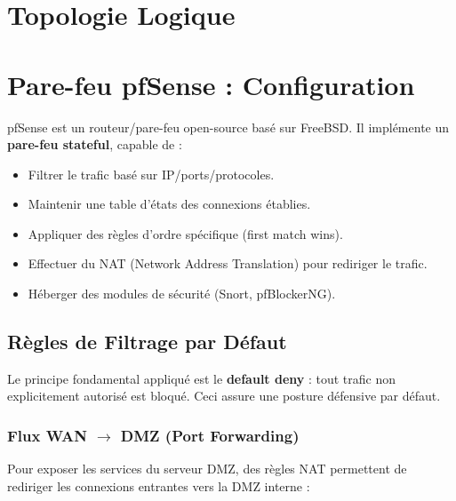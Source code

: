 \documentclass[12pt,a4paper,openany]{report}
\begin{document}
\section{Topologie Logique}


\section{Pare-feu pfSense : Configuration}

pfSense est un routeur/pare-feu open-source basé sur FreeBSD. Il implémente un \textbf{pare-feu stateful}, capable de :
\begin{itemize}
	\item Filtrer le trafic basé sur IP/ports/protocoles.
	\item Maintenir une table d'états des connexions établies.
	\item Appliquer des règles d'ordre spécifique (first match wins).
	\item Effectuer du NAT (Network Address Translation) pour rediriger le trafic.
	\item Héberger des modules de sécurité (Snort, pfBlockerNG).
\end{itemize}

\subsection{Règles de Filtrage par Défaut}

Le principe fondamental appliqué est le \textbf{default deny} : tout trafic non explicitement autorisé est bloqué. Ceci assure une posture défensive par défaut.

\subsubsection{Flux WAN $\rightarrow$ DMZ (Port Forwarding)}

Pour exposer les services du serveur DMZ, des règles NAT permettent de rediriger les connexions entrantes vers la DMZ interne :
\end{document}

